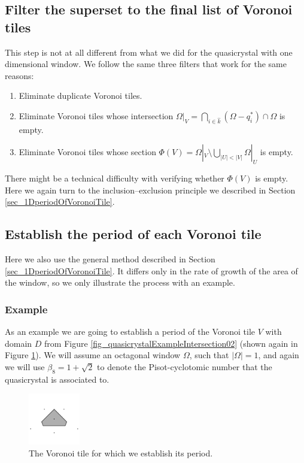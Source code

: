 \documentclass[text.tex]{subfiles}
\begin{document}
\subsection{Filter the superset to the final list of Voronoi tiles}
This step is not at all different from what we did for the quasicrystal with one dimensional window. We follow the same three filters that work for the same reasons: 
\begin{enumerate}
\item Eliminate duplicate Voronoi tiles. 
\item Eliminate Voronoi tiles whose intersection $\Omega|_{V} = \bigcap\limits_{i\in\hat{k}}(\Omega-q_i^\ast)\cap\Omega$ is empty. 
\item Eliminate Voronoi tiles whose section $\Phi(V) = \Omega|_{V}\setminus\bigcup_{|U|<|V|}\Omega|_{U}$ is empty. 
\end{enumerate}

There might be a technical difficulty with verifying whether $\Phi(V)$ is empty. Here we again turn to the inclusion--exclusion principle we described in Section \ref{sec_1DperiodOfVoronoiTile}. 

\subsection{Establish the period of each Voronoi tile}
Here we also use the general method described in Section \ref{sec_1DperiodOfVoronoiTile}. It differs only in the rate of growth of the area of the window, so we only illustrate the process with an example. 
\subsubsection{Example}
As an example we are going to establish a period of the Voronoi tile $V$ with domain $D$ from Figure \ref{fig_quasicrystalExampleIntersection02} (shown again in Figure \ref{fig_example2D_tile}). We will assume an octagonal window $\Omega$, such that $|\Omega| = 1$, and again we will use $\beta_8 = 1+\sqrt{2}$ to denote the Pisot-cyclotomic number that the quasicrystal is associated to. 

\begin{figure}[h!]
\centering
\includegraphics[width=0.2\textwidth]{img/2D/intersectionTile03}
\caption{The Voronoi tile for which we establish its period. }
\label{fig_example2D_tile}
\end{figure}
\end{document}
